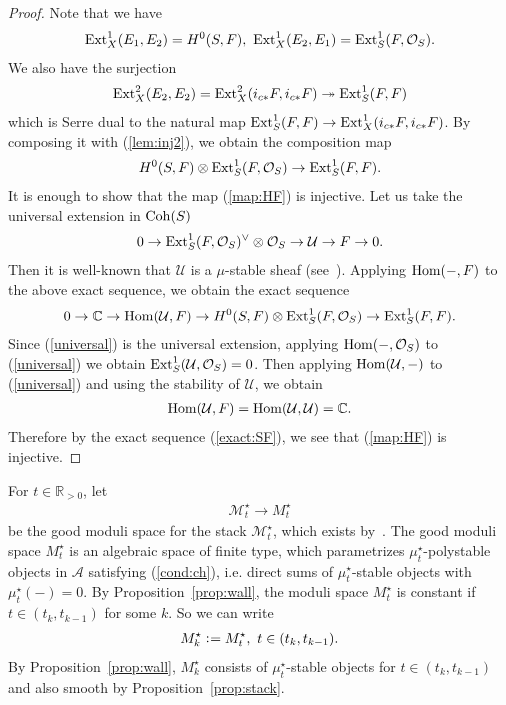 \documentclass[11pt]{amsart}
\theoremstyle{plain}
\newcommand{\aA}{\mathcal{A}}
\newcommand{\mM}{\mathcal{M}}
\newcommand{\oO}{\mathcal{O}}
\newcommand{\uU}{\mathcal{U}}
\newcommand{\Hom}{\mathop{\rm Hom}\nolimits}
\newcommand{\Ext}{\mathop{\rm Ext}\nolimits}
\newcommand{\Coh}{\mathop{\rm Coh}\nolimits}
\begin{document}
\begin{proof}
Note that we have
\begin{align*}
\Ext_X^1(E_1, E_2)=H^0(S, F), \ 
\Ext_X^1(E_2, E_1)=\Ext_S^1(F, \oO_S).
\end{align*}
We also have the surjection
\begin{align*}
\Ext_X^2(E_2, E_2)=\Ext_X^2(i_{c\ast}F, i_{c\ast}F) 
\twoheadrightarrow \Ext_S^1(F, F)
\end{align*}
which is Serre dual to the natural 
map 
$\Ext_S^1(F, F) \to \Ext_X^1(i_{c\ast}F, i_{c\ast}F)$. 
By composing it with (\ref{lem:inj2}), we obtain the 
composition map
\begin{align}\label{map:HF}
H^0(S, F) \otimes \Ext_S^1(F, \oO_S) \to \Ext_S^1(F, F). 
\end{align}
It is enough to 
show that the map (\ref{map:HF}) is injective.
Let us take the universal extension in 
$\Coh(S)$
\begin{align}\label{universal}
0 \to \Ext_S^1(F, \oO_S)^{\vee} \otimes \oO_S \to \uU 
\to F \to 0.
\end{align}
Then it is well-known that $\uU$ is a $\mu$-stable sheaf 
(see~\cite{MR1717621, noteBG}). 
Applying $\Hom(-, F)$ to the above exact sequence, we obtain 
the exact sequence
\begin{align}\label{exact:SF}
0 \to \mathbb{C} \to \Hom(\uU, F) \to 
H^0(S, F) \otimes \Ext_S^1(F, \oO_S) \to \Ext_S^1(F, F).
\end{align}
Since (\ref{universal})
is the universal extension, 
applying $\Hom(-, \oO_S)$ to (\ref{universal}) we obtain 
$\Ext_S^1(\uU, \oO_S)=0$. 
Then applying $\Hom(\uU, -)$ to (\ref{universal})
and using the stability of 
$\uU$, we obtain 
\begin{align*}
\Hom(\uU, F)=\Hom(\uU, \uU)=\mathbb{C}.
\end{align*} 
Therefore by the exact sequence (\ref{exact:SF}), we 
see that (\ref{map:HF}) is injective. 
\end{proof}

For $t \in \mathbb{R}_{>0}$, let 
\begin{align}\label{good:M}
\mM_t^{\star} \to M_t^{\star}
\end{align}
be the good moduli space for 
the stack $\mM_t^{\star}$, 
which exists by~\cite{AHLH}. 
The good 
moduli space $M_t^{\star}$ is an algebraic 
space of finite type, which parametrizes
$\mu_t^{\star}$-polystable objects in $\aA$
satisfying (\ref{cond:ch}), 
i.e. direct sums of $\mu_t^{\star}$-stable 
objects with $\mu_t^{\star}(-)=0$.
By Proposition~\ref{prop:wall}, 
the moduli space $M_t^{\star}$ is constant if $t \in (t_k, t_{k-1})$
for some $k$.
So we can write
\begin{align*}
M_k^{\star} \cneq M_t^{\star}, \ 
t \in (t_k, t_{k-1}). 
\end{align*} 
By Proposition~\ref{prop:wall}, 
$M_k^{\star}$ consists of 
$\mu_t^{\star}$-stable objects
for $t \in (t_k, t_{k-1})$
and also smooth by 
Proposition~\ref{prop:stack}. 
\end{document}
